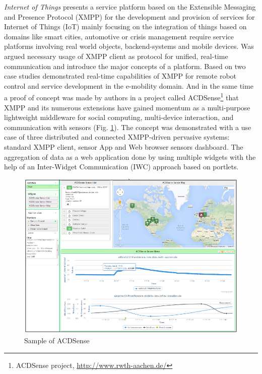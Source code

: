 	\emph{Internet of Things}\cite{bendel2013service} presents a service platform based on the Extensible Messaging and Presence Protocol (XMPP) for the development and provision of services for Internet of Things (IoT) mainly focusing on the integration of things based on domains like smart cities, automotive or crisis management require service platforms involving real world objects, backend-systems and mobile devices. Was argued necessary usage of XMPP client as protocol for unified, real-time communication and introduce the major concepts of a platform. Based on two case studies demonstrated real-time capabilities of XMPP for remote robot control and service development in the e-mobility domain. And in the same time a proof of concept was made by authors in a project called ACDSense\footnote{ACDSense project, \url{http://www.rwth-aachen.de/}} that XMPP and its numerous extensions have gained momentum as a multi-purpose lightweight middleware for social computing, multi-device interaction, and communication with sensors (Fig. \ref{img:acdsense}). The concept was demonstrated with a use case of three distributed and connected XMPP-driven pervasive systems: standard XMPP client, sensor App and Web browser sensors dashboard. The aggregation of data as a web application done by using multiple widgets with the help of an Inter-Widget Communication (IWC) approach based on portlets\cite{ACDSense}.
	    \begin{figure}[!ht]
		\centering
		\includegraphics[scale=0.6]{Material/examples/ACDSense.png}   
		\caption[Sample of ACDSense]{Sample of ACDSense}
		\label{img:acdsense}                  
		\end{figure} 

